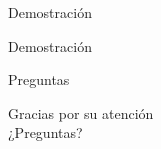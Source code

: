 \documentclass[10pt,xcolor=svgnames]{beamer}
\begin{document}
\begin{frame}{Demostración}

  \begin{center}
    \Huge Demostración
  \end{center}
\end{frame}  


\begin{frame}{Preguntas}

  \begin{center}
    \Large Gracias por su atención\\
    \vspace*{1cm}
    \Huge \textcolor{naranja}{¿Preguntas?}
  \end{center}
\end{frame}  

\licencia
\end{document}
